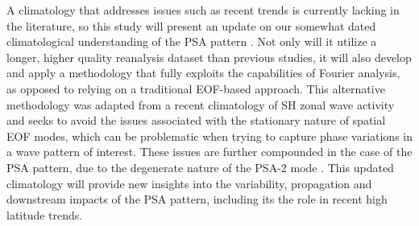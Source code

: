 A climatology that addresses issues such as recent trends is currently lacking in the literature, so this study will present an update on our somewhat dated climatological understanding of the PSA pattern \citep{Mo1998,Mo2001}. Not only will it utilize a longer, higher quality reanalysis dataset than previous studies, it will also develop and apply a methodology that fully exploits the capabilities of Fourier analysis, as opposed to relying on a traditional EOF-based approach. This alternative methodology was adapted from a recent climatology of SH zonal wave activity \citep{IrvingSimmonds2015} and seeks to avoid the issues associated with the stationary nature of spatial EOF modes, which can be problematic when trying to capture phase variations in a wave pattern of interest. These issues are further compounded in the case of the PSA pattern, due to the degenerate \citep{North1982} nature of the PSA-2 mode \citep[e.g. Figure 1;][]{Mo2000}. This updated climatology will provide new insights into the variability, propagation and downstream impacts of the PSA pattern, including its the role in recent high latitude trends. 

